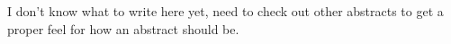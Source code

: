 I don't know what to write here yet, need to check out other abstracts to get a proper feel for how an abstract should be.